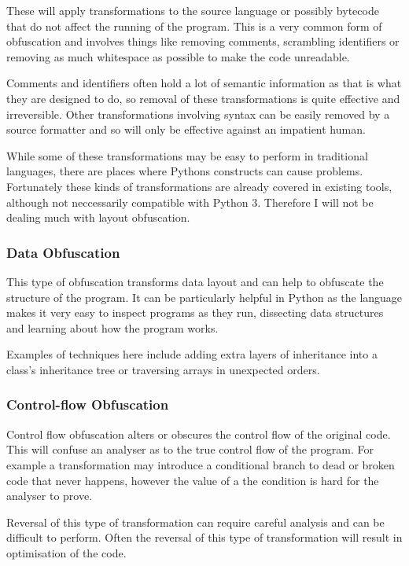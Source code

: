 \documentclass{report}
\begin{document}
These will apply transformations to the source language or possibly bytecode that do not affect the running of the
program. This is a very common form of obfuscation\cite[p10]{desevobf} and involves things like removing comments,
scrambling identifiers or removing as much whitespace as possible to make the code unreadable.

Comments and identifiers often hold a lot of semantic information as that is what they are designed to do, so
removal of these transformations is quite effective and irreversible. Other transformations involving syntax
can be easily removed by a source formatter and so will only be effective against an impatient human.

While some of these transformations may be easy to perform in traditional languages, there are places where
Pythons constructs can cause problems. Fortunately these kinds of transformations are already covered in existing
tools, although not neccessarily compatible with Python 3. Therefore I will not be dealing much with layout obfuscation.

\subsubsection{Data Obfuscation}

This type of obfuscation transforms data layout and can help to obfuscate the structure of the program. It can be
particularly helpful in Python as the language makes it very easy to inspect programs as they run, dissecting data
structures and learning about how the program works.

Examples of techniques here include adding extra layers of inheritance into a class's inheritance tree or traversing arrays
in unexpected orders.

\subsubsection{Control-flow Obfuscation}

Control flow obfuscation alters or obscures the control flow of the original code. This will confuse an analyser as to the
true control flow of the program. For example a transformation may introduce a conditional branch to dead or broken code
that never happens, however the value of a the condition is hard for the analyser to prove.

Reversal of this type of transformation can require careful analysis and can be difficult to perform. Often the reversal
of this type of transformation will result in optimisation of the code.
\end{document}
